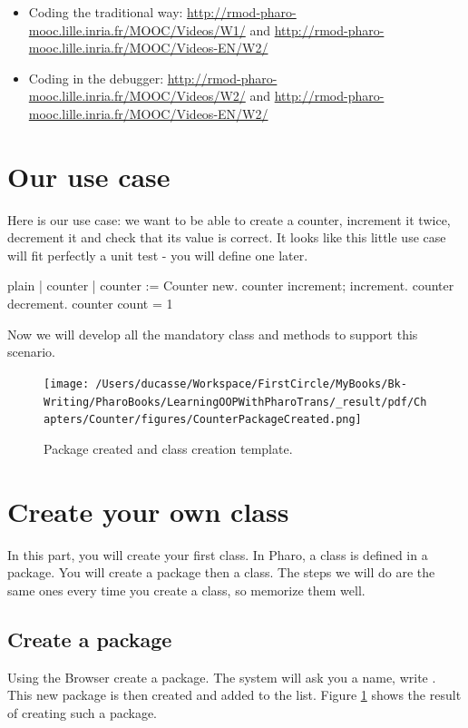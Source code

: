 \documentclass[10pt,twoside,english]{_support/latex/sbabook/sbabook}
\begin{document}
\begin{itemize}
\item Coding the traditional way: \url{http://rmod-pharo-mooc.lille.inria.fr/MOOC/Videos/W1/} and \url{http://rmod-pharo-mooc.lille.inria.fr/MOOC/Videos-EN/W2/}
\item Coding in the debugger: \url{http://rmod-pharo-mooc.lille.inria.fr/MOOC/Videos/W2/} and \url{http://rmod-pharo-mooc.lille.inria.fr/MOOC/Videos-EN/W2/}
\end{itemize}
\section{Our use case}
Here is our use case: we want to be able to create a counter, increment it twice, decrement it and check that its value is correct. It looks like this little use case will fit perfectly a unit test - you will define one later. 

\begin{displaycode}{plain}
| counter |
counter := Counter new.
counter increment; increment.
counter decrement.
counter count = 1
\end{displaycode}

Now we will develop all the mandatory class and methods to support this scenario.


\begin{figure}

\begin{center}
\texttt{[image: /Users/ducasse/Workspace/FirstCircle/MyBooks/Bk-Writing/PharoBooks/LearningOOPWithPharoTrans/\_result/pdf/Chapters/Counter/figures/CounterPackageCreated.png]}\caption{Package created and class creation template.\label{figpackageCreated}}\end{center}
\end{figure}

\section{Create your own class}
In this part, you will create your first class. In Pharo, a class is defined in a package. You will create a package then a class. The steps we will do are the same ones every time you create a class, so memorize them well. 
\subsection{Create a package}
Using the Browser create a package. The system will ask you a name, write . This new package is then created and added to the list. Figure \ref{figpackageCreated} shows the result of creating such a package.
\end{document}
